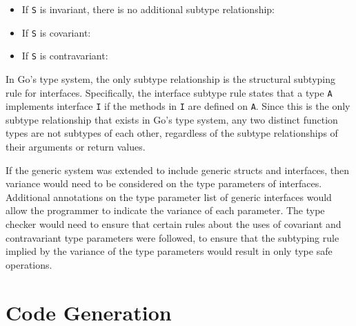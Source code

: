 \documentclass[letterpaper,11pt]{article}
\begin{document}
\begin{itemize}
\item If \texttt{S} is invariant, there is no additional subtype relationship:
\begin{mathpar}
\end{mathpar}
\item If \texttt{S} is covariant:
\begin{mathpar}
\end{mathpar}

\item If \texttt{S} is contravariant:
\begin{mathpar}
\end{mathpar}
\end{itemize}

In Go's type system, the only subtype relationship is the structural subtyping rule for interfaces. Specifically, the interface subtype rule states that a type \texttt{A} implements interface \texttt{I} if the methods in \texttt{I} are defined on \texttt{A}. Since this is the only subtype relationship that exists in Go's type system, any two distinct function types are not subtypes of each other, regardless of the subtype relationships of their arguments or return values. 

If the generic system was extended to include generic structs and interfaces, then variance would need to be considered on the type parameters of interfaces. Additional annotations on the type parameter list of generic interfaces would allow the programmer to indicate the variance of each parameter. The type checker would need to ensure that certain rules about the uses of covariant and contravariant type parameters were followed, to ensure that the subtyping rule implied by the variance of the type parameters would result in only type safe operations.

\section{Code Generation} \label{codegeneration}
\end{document}
